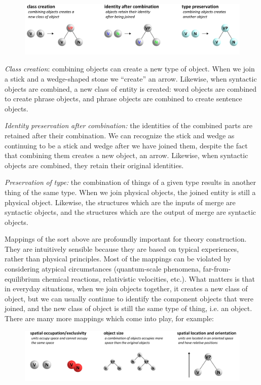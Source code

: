   
\begin{figure}
\includegraphics[width=\textwidth]{figures/Tilsen-img29.png}
\caption{\missingcaption}
\label{fig:}
\end{figure}
 

\textit{Class} \textit{creation}: combining objects can create a new type of object. When we join a stick and a wedge-shaped stone we “create” an arrow. Likewise, when syntactic objects are combined, a new class of entity is created: word objects are combined to create phrase objects, and phrase objects are combined to create sentence objects. 

\textit{Identity} \textit{preservation} \textit{after} \textit{combination:} the identities of the combined parts are retained after their combination. We can recognize the stick and wedge as continuing to be a stick and wedge after we have joined them, despite the fact that combining them creates a new object, an arrow. Likewise, when syntactic objects are combined, they retain their original identities.

\textit{Preservation} \textit{of} \textit{type:} the combination of things of a given type results in another thing of the same type. When we join physical objects, the joined entity is still a physical object. Likewise, the structures which are the inputs of merge are syntactic objects, and the structures which are the output of merge are syntactic objects.

  Mappings of the sort above are profoundly important for theory construction. They are intuitively sensible because they are based on typical experiences, rather than physical principles. Most of the mappings can be violated by considering atypical circumstances (quantum-scale phenomena, far-from-equilibrium chemical reactions, relativistic velocities, etc.). What matters is that in everyday situations, when we join objects together, it creates a new class of object, but we can usually continue to identify the component objects that were joined, and the new class of object is still the same type of thing, i.e. an object. There are many more mappings which come into play, for example:

  
\begin{figure}
\includegraphics[width=\textwidth]{figures/Tilsen-img30.png}
\caption{\missingcaption}
\label{fig:}
\end{figure}
 

